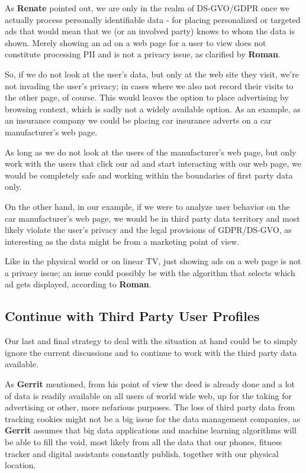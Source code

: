 As \textbf{Renate} pointed out, we are only in the realm of DS-GVO/GDPR once we actually process personally identifiable data - for placing personalized or targeted ads that would mean that we (or an involved party) knows to whom the data is shown. Merely showing an ad on a web page for a user to view does not constitute processing PII and is not a privacy issue, as clarified by \textbf{Roman}.

So, if we do not look at the user's data, but only at the web site they visit, we're not invading the user's privacy; in cases where we also not record their visits to the other page, of course. This would leaves the option to place advertising by browsing context, which is sadly not a widely available option. As an example, as an insurance company we could be placing car insurance adverts on a car manufacturer's web page. 

As long as we do not look at the users of the manufacturer's web page, but only work with the users that click our ad and start interacting with our web page, we would be completely safe and working within the boundaries of first party data only.

On the other hand, in our example, if we were to analyze user behavior on the car manufacturer's web page, we would be in third party data territory and most likely violate the user's privacy and the legal provisions of GDPR/DS-GVO, as interesting as the data might be from a marketing point of view.

Like in the physical world or on linear TV, just showing ads on a web page is not a privacy issue; an issue could possibly be with the algorithm that selects which ad gets displayed, according to \textbf{Roman}.

\subsection{Continue with Third Party User Profiles}

Our last and final strategy to deal with the situation at hand could be to simply ignore the current discussions and to continue to work with the third party data available.

As \textbf{Gerrit} mentioned, from his point of view the deed is already done and a lot of data is readily available on all users of world wide web, up for the taking for advertising or other, more nefarious purposes. The loss of third party data from tracking cookies might not be a big issue for the data management companies, as \textbf{Gerrit} assumes that big data applications and machine learning algorithms will be able to fill the void, most likely from all the data that our phones, fitness tracker and digital assistants constantly publish, together with our physical location.


